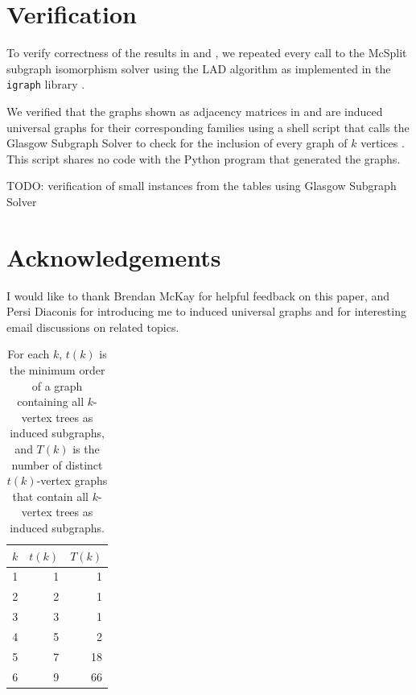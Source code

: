 \documentclass[12pt]{article}
\begin{document}
\section{Verification}\label{sec:verification}

To verify correctness of the results in
 and , we repeated every call to
the McSplit subgraph isomorphism solver using the LAD algorithm \cite{DBLP:journals/ai/Solnon10}
as implemented in the \texttt{igraph} library \cite{igraph}.

We verified that the graphs shown as adjacency matrices in 
and  are induced universal graphs for their corresponding families
using a shell script that calls the Glasgow Subgraph Solver to check for the
inclusion of every graph of $k$ vertices \cite{DBLP:conf/cp/McCreeshP15,DBLP:conf/gg/McCreeshP020}.
This script shares no code with the Python program that generated the graphs.

TODO: verification of small instances from the tables using Glasgow Subgraph Solver


\section{Acknowledgements}

I would like to thank Brendan McKay for helpful feedback on this paper, and Persi
Diaconis for introducing me to induced universal graphs and for interesting email
discussions on related topics.

\begin{table}[h!]
\centering
\begin{tabular}{r r r}
 \toprule
 $k$ & $t(k)$ & $T(k)$ \\ [0.5ex]
 \midrule
 1 & 1 & 1 \\
 2 & 2 & 1 \\
 3 & 3 & 1 \\
 4 & 5 & 2 \\
 5 & 7 & 18 \\
 6 & 9 & 66 \\
 \bottomrule
\end{tabular}
\caption{For each $k$, $t(k)$ is the minimum order of a graph containing all $k$-vertex trees as
induced subgraphs, and $T(k)$ is the number of distinct $t(k)$-vertex graphs that contain
all $k$-vertex trees as induced subgraphs.}
\label{tab:treeresults}
\end{table}
\end{document}
